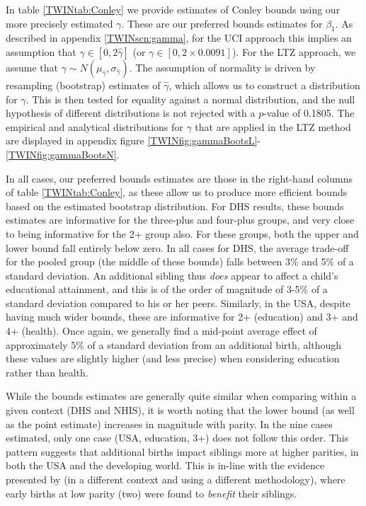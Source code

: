 In table \ref{TWINtab:Conley} we provide estimates of Conley bounds using 
our more precisely estimated $\gamma$.  These are our preferred bounds 
estimates for $\beta_1$.  As described in appendix \ref{TWINscn:gamma}, for 
the UCI approach this implies an assumption that $\gamma \in [0,2\hat\gamma]$
(or $\gamma \in [0,2\times 0.0091]$).  For the LTZ approach, we assume that 
$\gamma\sim N(\mu_{\hat\gamma},\sigma_{\hat\gamma})$.  The assumption of 
normality is driven by resampling (bootstrap) estimates of $\hat\gamma$,
which allows us to construct a distribution for $\gamma$.  This is then
tested for equality against a normal distribution, and the null hypothesis
of different distributions is not rejected with a $p$-value of 0.1805.  The 
empirical and analytical distributions for $\gamma$ that are applied in the 
LTZ method are displayed in appendix figure \ref{TWINfig:gammaBootsL}-%
\ref{TWINfig:gammaBootsN}.

In all cases, our preferred bounds estimates are those in the right-hand
columns of table \ref{TWINtab:Conley}, as these allow us to produce more
efficient bounds based on the estimated bootstrap distribution.  For DHS
results, these bounds estimates are informative for the three-plus and 
four-plus groups, and very close to being informative for the 2+ group also.  
For these groups, both the upper and lower bound fall entirely below zero. In
all cases for DHS, the average trade-off for the pooled group (the middle of
these bounds) falls between 3\% and 5\% of a standard deviation.  An additional
sibling thus \emph{does} appear to affect a child's educational attainment,
and this is of the order of magnitude of 3-5\% of a standard deviation compared
to his or her peers.  Similarly, in the USA, despite having much wider bounds,
these are informative for 2+ (education) and 3+ and 4+ (health).  Once again,
we generally find a mid-point average effect of approximately 5\% of a 
standard deviation from an additional birth, although these values are slightly
higher (and less precise) when considering education rather than health.

While the bounds estimates are generally quite similar when comparing within
a given context (DHS and NHIS), it is worth noting that the lower bound (as
well as the point estimate) increases in magnitude with parity.  In the nine
cases estimated, only one case (USA, education, 3+) does not follow this order.
This pattern suggests that additional births impact siblings more at higher
parities, in both the USA and the developing world.  This is in-line with the
evidence presented by \citet{Qian2009} (in a different context and using a 
different methodology), where early births at low parity (two) were found to 
\emph{benefit} their siblings.

